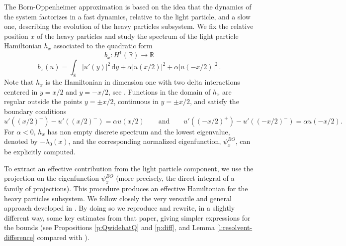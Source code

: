 \documentclass[a4paper,11pt,reqno]{amsart}
\theoremstyle{definition}
\numberwithin{equation}{section}
\newcommand{\RE}{\mathbb R}
\newcommand{\BB}{\mathcal B}
\newcommand{\QQ}{\mathcal Q}
\newcommand{\Lscr}{\mathscr{L}}
\renewcommand{\d}{\mathrm{d}}
\begin{document}
The Born-Oppenheimer approximation is based on the idea that the dynamics of the system factorizes in a fast dynamics, relative to the light particle, and a slow one, describing the evolution of the heavy particles subsystem.  We fix the relative position $x$ of the heavy particles and study the spectrum of the light particle Hamiltonian $h_x$ associated to the quadratic form 
\[
b_{x}: H^1(\RE)  \to\RE
\]
\[
b_x (u) = \int_\RE |u'(y)|^2\, \d y + \alpha |u(x/2)|^2+\alpha |u(-x/2)|^2\,.
\]
 Note that $h_x$ is the Hamiltonian in dimension one with two delta interactions centered in $y=x/2$ and $y=-x/2$, see \cite{AGHKH05}. Functions in the domain of $h_x$ are regular outside the points $y=\pm x/2$, continuous in $y = \pm x/2$,  and satisfy the boundary conditions 
\[
u'((x/2)^+) -u'((x/2)^-) =\alpha u(x/2)
\qquad\text{and}\qquad 
u'((-x/2)^+)-u'((-x/2)^-)=\alpha u(-x/2).
\]
For $\alpha<0$, $h_x$ has non empty discrete spectrum and the lowest eigenvalue, denoted by $-\lambda_0(x)$, and the corresponding normalized eigenfunction, $ \psi^{BO}_{x}$, can be explicitly computed. 



To extract an effective contribution from the light particle component, we use the projection on the eigenfunction $\psi^{BO}_{x}$ (more precisely, the direct integral of a family of projections). This procedure produces an effective Hamiltonian for the heavy particles subsystem. We follow closely the  very versatile and general approach developed in \cite{Krejcirik-etal-m2018}. By doing so we reproduce and rewrite, in a slightly different way, some key estimates from that paper, giving simpler expressions for the bounds (see Propositions \ref{p:QwidehatQ} and \ref{p:diff}, and Lemma \ref{l:resolvent-difference} compared with \cite[Theorems 1.1 and 2.5, and Proposition 2.6]{Krejcirik-etal-m2018}).
\end{document}
